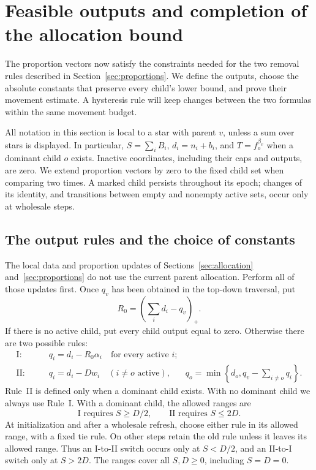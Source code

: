\section{Feasible outputs and completion of the allocation bound}
\label{sec:allocation-finish}

The proportion vectors now satisfy the constraints needed for the two
removal rules described in Section~\ref{sec:proportions}.  We define the
outputs, choose the absolute constants that preserve every child's lower
bound, and prove their movement estimate.  A hysteresis rule will keep
changes between the two formulas within the same movement budget.

All notation in this section is local to a star with parent \(v\), unless
a sum over stars is displayed.  In particular, \(S=\sum_i B_i\),
\(d_i=n_i+b_i\), and \(T=f_o^{\beta_v}\) when a dominant child \(o\)
exists.  Inactive coordinates, including their caps and outputs, are zero.
We extend proportion vectors by zero to the fixed child set when comparing
two times.  A marked child persists throughout its epoch; changes of its
identity, and transitions between empty and nonempty active sets, occur
only at wholesale steps.

\subsection{The output rules and the choice of constants}

The local data and proportion updates of
Sections~\ref{sec:allocation} and~\ref{sec:proportions} do not use the
current parent allocation.  Perform all of those updates first.  Once
\(q_v\) has been obtained in the top-down traversal, put
\begin{equation}
 R_0=\left(\sum_i d_i-q_v\right)_+.
 \label{eq:required-holes}
\end{equation}
If there is no active child, put every child output equal to zero.
Otherwise there are two possible rules:
\begin{align}
 \text{I:}\qquad &q_i=d_i-R_0\alpha_i\quad\text{for every active }i;
 \label{eq:output-rule-one}\\
 \text{II:}\qquad &q_i=d_i-Dw_i\quad(i\ne o\text{ active}),
 &q_o=\min\left\{d_o,q_v-\sum_{i\ne o}q_i\right\}.
 \label{eq:output-rule-two}
\end{align}
Rule~II is defined only when a dominant child exists.  With no dominant
child we always use Rule~I.  With a dominant child, the allowed ranges are
\begin{equation}
 \text{I requires }S\ge D/2,
 \qquad
 \text{II requires }S\le 2D.
 \label{eq:regime-ranges}
\end{equation}
At initialization and after a wholesale refresh, choose either rule in
its allowed range, with a fixed tie rule.  On other steps retain the old
rule unless it leaves its allowed range.  Thus an I-to-II switch occurs
only at \(S<D/2\), and an II-to-I switch only at \(S>2D\).  The ranges
cover all \(S,D\ge0\), including \(S=D=0\).

